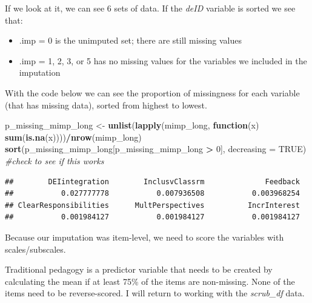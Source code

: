 \documentclass[
  11pt,
]{book}
\newenvironment{Shaded}{\begin{snugshade}}{\end{snugshade}}
\newcommand{\AttributeTok}[1]{\textcolor[rgb]{0.27,0.27,0.27}{#1}}
\newcommand{\CommentTok}[1]{\textcolor[rgb]{0.37,0.37,0.37}{\textit{#1}}}
\newcommand{\ConstantTok}[1]{\textcolor[rgb]{0.37,0.37,0.37}{#1}}
\newcommand{\ControlFlowTok}[1]{\textcolor[rgb]{0.27,0.27,0.27}{\textbf{#1}}}
\newcommand{\DecValTok}[1]{\textcolor[rgb]{0.06,0.06,0.06}{#1}}
\newcommand{\FunctionTok}[1]{\textcolor[rgb]{0.27,0.27,0.27}{\textbf{#1}}}
\newcommand{\NormalTok}[1]{#1}
\newcommand{\OtherTok}[1]{\textcolor[rgb]{0.37,0.37,0.37}{#1}}
\newcommand{\SpecialCharTok}[1]{\textcolor[rgb]{0.43,0.43,0.43}{\textbf{#1}}}
\providecommand{\tightlist}{%
  \setlength{\itemsep}{0pt}\setlength{\parskip}{0pt}}
\begin{document}
If we look at it, we can see 6 sets of data. If the \emph{deID} variable is sorted we see that:

\begin{itemize}
\tightlist
\item
  .imp = 0 is the unimputed set; there are still missing values
\item
  .imp = 1, 2, 3, or 5 has no missing values for the variables we included in the imputation
\end{itemize}

With the code below we can see the proportion of missingness for each variable (that has missing data), sorted from highest to lowest.

\begin{Shaded}
\begin{Highlighting}[]
\NormalTok{p\_missing\_mimp\_long }\OtherTok{\textless{}{-}} \FunctionTok{unlist}\NormalTok{(}\FunctionTok{lapply}\NormalTok{(mimp\_long, }\ControlFlowTok{function}\NormalTok{(x) }\FunctionTok{sum}\NormalTok{(}\FunctionTok{is.na}\NormalTok{(x))))}\SpecialCharTok{/}\FunctionTok{nrow}\NormalTok{(mimp\_long)}
\FunctionTok{sort}\NormalTok{(p\_missing\_mimp\_long[p\_missing\_mimp\_long }\SpecialCharTok{\textgreater{}} \DecValTok{0}\NormalTok{], }\AttributeTok{decreasing =} \ConstantTok{TRUE}\NormalTok{)  }\CommentTok{\#check to see if this works}
\end{Highlighting}
\end{Shaded}

\begin{verbatim}
##        DEIintegration        InclusvClassrm              Feedback 
##           0.027777778           0.007936508           0.003968254 
## ClearResponsibilities      MultPerspectives          IncrInterest 
##           0.001984127           0.001984127           0.001984127
\end{verbatim}

Because our imputation was item-level, we need to score the variables with scales/subscales.

Traditional pedagogy is a predictor variable that needs to be created by calculating the mean if at least 75\% of the items are non-missing. None of the items need to be reverse-scored. I will return to working with the \emph{scrub\_df} data.
\end{document}
